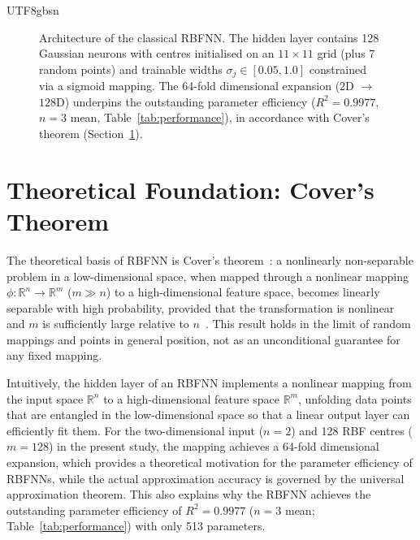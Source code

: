 \documentclass[a4paper,12pt]{report}
\begin{document}
\begin{CJK}{UTF8}{gbsn}
\begin{figure}[H]
\caption{Architecture of the classical RBFNN. The hidden layer contains 128 Gaussian
neurons with centres initialised on an $11\!\times\!11$ grid (plus 7 random points) and
trainable widths $\sigma_j\!\in\![0.05,1.0]$ constrained via a sigmoid mapping. The
64-fold dimensional expansion ($2$D $\to$ $128$D) underpins the outstanding parameter
efficiency ($R^2=0.9977$, $n{=}3$ mean, Table~\ref{tab:performance}), in accordance
with Cover's theorem (Section~\ref{sec:cover}).}
\label{fig:rbfnn}
\end{figure}

\section{Theoretical Foundation: Cover's Theorem}
\label{sec:cover}

The theoretical basis of RBFNN is Cover's theorem~\cite{cover1965}: a nonlinearly
non-separable problem in a low-dimensional space, when mapped through a nonlinear mapping
$\phi: \mathbb{R}^n \to \mathbb{R}^m$ ($m \gg n$) to a high-dimensional feature space,
becomes linearly separable with high probability, provided that the transformation is nonlinear and $m$ is sufficiently large relative to $n$~\cite{cover1965}. This result holds in the limit of random mappings and points in general position, not as an unconditional guarantee for any fixed mapping.

Intuitively, the hidden layer of an RBFNN implements a nonlinear mapping from the input
space $\mathbb{R}^n$ to a high-dimensional feature space $\mathbb{R}^m$, unfolding
data points that are entangled in the low-dimensional space so that a linear output layer
can efficiently fit them. For the two-dimensional input ($n = 2$) and 128 RBF centres
($m = 128$) in the present study, the mapping achieves a %
64-fold dimensional expansion,
which provides a theoretical motivation for the parameter efficiency of RBFNNs, while
the actual approximation accuracy is governed by the universal approximation theorem.
This also explains why the RBFNN achieves the outstanding parameter efficiency of
$R^2 = 0.9977$ ($n{=}3$ mean; Table~\ref{tab:performance}) with only 513 parameters.


\end{CJK}
\end{document}
